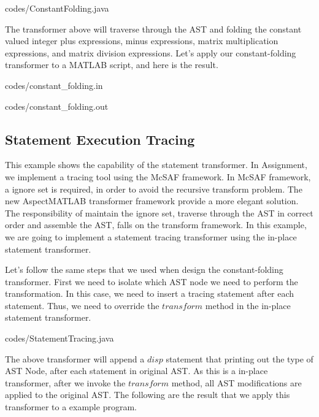 \documentclass{comp621}
\begin{document}

                {codes/ConstantFolding.java}

The transformer above will traverse through the AST and folding the constant
valued integer plus expressions, minus expressions, matrix multiplication
expressions, and matrix division expressions. Let's apply our constant-folding
transformer to a MATLAB script, and here is the result.

\begin{multicols}{2}

                {codes/constant_folding.in}
\columnbreak

                {codes/constant_folding.out}
\end{multicols}

\subsection{Statement Execution Tracing}
This example shows the capability of the statement transformer. In Assignment,
we implement a tracing tool using the McSAF framework. In McSAF framework, a
ignore set is required, in order to avoid the recursive transform problem. The
new AspectMATLAB transformer framework provide a more elegant solution. The
responsibility of maintain the ignore set, traverse through the AST in correct
order and assemble the AST, falls on the transform framework.  In this example,
we are going to implement a statement tracing transformer using the in-place
statement transformer.

Let's follow the same steps that we used when design the constant-folding
transformer. First we need to isolate which AST node we need to perform the
transformation. In this case, we need to insert a tracing statement after each
statement. Thus, we need to override the $transform$ method in the in-place
statement transformer.


                {codes/StatementTracing.java}

The above transformer will append a $disp$ statement that printing out the type
of AST Node, after each statement in original AST. As this is a in-place
transformer, after we invoke the $transform$ method, all AST modifications are
applied to the original AST. The following are the result that we apply this
transformer to a example program.
\end{document}
